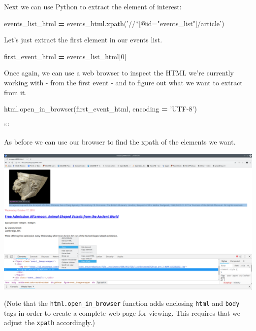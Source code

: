 \documentclass[]{book}
\newenvironment{Shaded}{\begin{snugshade}}{\end{snugshade}}
\newcommand{\DecValTok}[1]{\textcolor[rgb]{0.00,0.00,0.81}{#1}}
\newcommand{\NormalTok}[1]{#1}
\newcommand{\OperatorTok}[1]{\textcolor[rgb]{0.81,0.36,0.00}{\textbf{#1}}}
\newcommand{\StringTok}[1]{\textcolor[rgb]{0.31,0.60,0.02}{#1}}
\begin{document}
Next we can use Python to extract the element of interest:

\begin{Shaded}
\begin{Highlighting}[]
\NormalTok{events_list_html }\OperatorTok{=}\NormalTok{ events_html.xpath(}\StringTok{'//*[@id="events_list"]/article'}\NormalTok{)}
\end{Highlighting}
\end{Shaded}

Let's just extract the first element in our events list.

\begin{Shaded}
\begin{Highlighting}[]
\NormalTok{first_event_html }\OperatorTok{=}\NormalTok{ events_list_html[}\DecValTok{0}\NormalTok{]}
\end{Highlighting}
\end{Shaded}

Once again, we can use a web browser to inspect the HTML we're currently working with - from the first event - and to figure out what we want to extract from it.

\begin{Shaded}
\begin{Highlighting}[]
\NormalTok{html.open_in_browser(first_event_html, encoding }\OperatorTok{=} \StringTok{'UTF-8'}\NormalTok{)}
\end{Highlighting}
\end{Shaded}

```

As before we can use our browser to find the xpath of the elements we want.

\includegraphics{Python/PythonWebScrape/images/dev_tools_figcaption.png}

(Note that the \texttt{html.open\_in\_browser} function adds enclosing \texttt{html} and \texttt{body} tags in order to create a complete web page for viewing. This requires that we adjust the \texttt{xpath} accordingly.)
\end{document}
